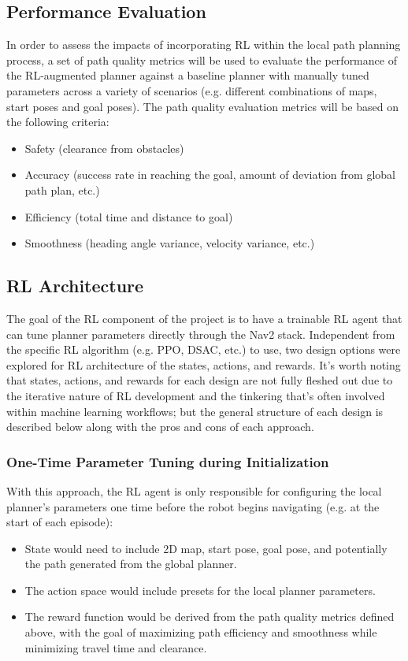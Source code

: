 \documentclass[conference]{IEEEtran}
\begin{document}
    \subsection{Performance Evaluation}
    In order to assess the impacts of incorporating RL within the local path planning process, a set of path quality metrics will be used to evaluate the performance of the RL-augmented planner against a baseline planner with manually tuned parameters across a variety of scenarios (e.g. different combinations of maps, start poses and goal poses). The path quality evaluation metrics will be based on the following criteria:
    \begin{itemize}
        \item Safety (clearance from obstacles)
        \item Accuracy (success rate in reaching the goal, amount of deviation from global path plan, etc.)
        \item Efficiency (total time and distance to goal)
        \item Smoothness (heading angle variance, velocity variance, etc.)
    \end{itemize}

    \subsection{RL Architecture}
    The goal of the RL component of the project is to have a trainable RL agent that can tune planner parameters directly through the Nav2 stack. Independent from the specific RL algorithm (e.g. PPO, DSAC, etc.) to use, two design options were explored for RL architecture of the states, actions, and rewards. It's worth noting that states, actions, and rewards for each design are not fully fleshed out due to the iterative nature of RL development and the tinkering that's often involved within machine learning workflows; but the general structure of each design is described below along with the pros and cons of each approach. 

        \subsubsection{One-Time Parameter Tuning during Initialization}
        With this approach, the RL agent is only responsible for configuring the local planner's parameters one time before the robot begins navigating (e.g. at the start of each episode):
        \begin{itemize}
            \item State would need to include 2D map, start pose, goal pose, and potentially the path generated from the global planner.
            \item The action space would include presets for the local planner parameters.
            \item The reward function would be derived from the path quality metrics defined above, with the goal of maximizing path efficiency and smoothness while minimizing travel time and clearance. 
        \end{itemize}
\end{document}

